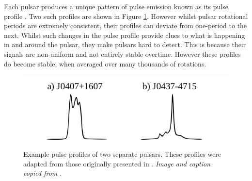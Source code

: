 Each pulsar produces a unique pattern of pulse emission known as its pulse profile \citep{lorimer2008}. Two such profiles are shown in Figure \ref{fig:fig-3}. However whilst pulsar rotational periods are extremely consistent, their profiles can deviate from one-period to the next. Whilst such changes in the pulse profile provide clues to what is happening in and around the pulsar, they make pulsars hard to detect. This is because their signals are non-uniform and not entirely stable overtime. However these profiles do become stable, when averaged over many thousands of rotations.
\begin{figure}[!h]
\centering
\includegraphics[scale=0.4]{figures/fig-3}
\caption[Pulse profiles of two separate pulsars]{Example pulse profiles of two separate pulsars. These profiles were adapted from those originally presented in \citep{lorimer}.  \textit{Image and caption copied from} \citep{lyon}.}	
\label{fig:fig-3}
\end{figure}

